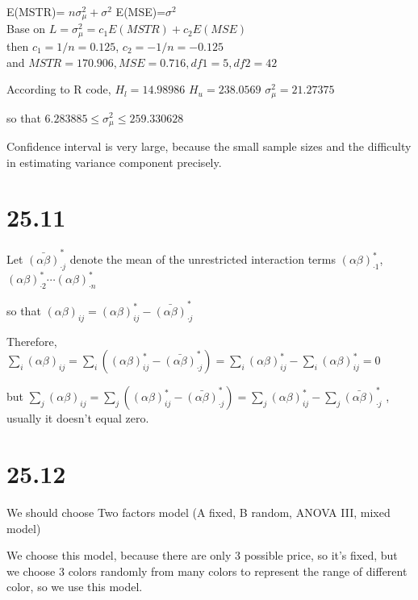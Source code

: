 \documentclass{article}\usepackage[]{graphicx}\usepackage[]{color}
\begin{document}
\begin{enumerate}[(a)]
\begin{center}
E(MSTR)= $n\sigma_\mu^2+\sigma^2$ \qquad E(MSE)=$\sigma^2$\\
Base on $L=\sigma_\mu^2=c_1E(MSTR)+c_2E(MSE)$\\
then $c_1=1/n=0.125$, $c_2=-1/n=-0.125$\\
and $MSTR=170.906, MSE=0.716, df1=5, df2=42$\\
\end{center}

According to R code, $H_l=14.98986$ \qquad $H_u=238.0569$ \qquad $\sigma_\mu^2=21.27375$

\qquad so that $6.283885 \leq \sigma_\mu^2 \leq 259.330628$

Confidence interval is very large, because the small sample sizes and the difficulty in estimating variance component precisely.

\end{enumerate}

\section {25.11}

Let $\bar{(\alpha\beta)}_{\cdot j}^*$ denote the mean of the unrestricted interaction terms $(\alpha\beta)^*_{\cdot 1}$,$(\alpha\beta)^*_{\cdot 2} \cdots  (\alpha\beta)^*_{\cdot n}$

so that $(\alpha\beta)_{ij} = (\alpha\beta)_{ij}^* - \bar{(\alpha\beta)}_{\cdot j}^*$

Therefore, $\sum_i(\alpha\beta)_{ij} = \sum_i( (\alpha\beta)_{ij}^* - \bar{(\alpha\beta)}_{\cdot j}^*) = \sum_i(\alpha\beta)_{ij}^* - \sum_i(\alpha\beta)_{ij}^*=0$

but $\sum_j(\alpha\beta)_{ij} = \sum_j( (\alpha\beta)_{ij}^* - \bar{(\alpha\beta)}_{\cdot j}^*) = \sum_j(\alpha\beta)_{ij}^* - \sum_j\bar{(\alpha\beta)}_{\cdot j}^*$ , usually it doesn't equal zero.


\section {25.12}

We should choose Two factors model (A fixed, B random, ANOVA III, mixed model)


We choose this model, because  there are only 3 possible price, so it's fixed, but we choose 3 colors randomly from many colors to represent the range of different color, so we use this model.
\end{document}
